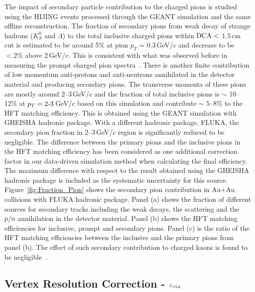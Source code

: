 \documentclass[%
 reprint,	
 amsmath,amssymb,
 aps,
 prc,
]{revtex4-1}
\begin{document}
The impact of secondary particle contribution to the charged pions is studied using the HIJING events processed through the GEANT simulation and the same offline reconstruction. The fraction of secondary pions from weak decay of strange hadrons ($K^0_S$ and $\Lambda$) to the total inclusive charged pions within ${\rm DCA}<$ 1.5\,cm cut is estimated to be around 5\% at pion $p_{T}$ = 0.3\,GeV/$c$ and decrease to be $<2\%$ above 2\,GeV/$c$. This is consistent with what was observed before in measuring the prompt charged pion spectra~\cite{Adams:2003xp}. There is another finite contribution of low momentum anti-protons and anti-neutrons annihilated in the detector material and producing secondary pions. The transverse momenta of these pions are mostly around 2--3\,GeV/$c$ and the fraction of total inclusive pions is $\sim$ 10--12\% at $p_{T} =2\textup{-}3$\,GeV/$c$ based on this simulation and contribute $\sim$ 5--8\% to the HFT matching efficiency. This is obtained using the GEANT simulation with GHEISHA hadronic package. With a different hadronic package, FLUKA, the secondary pion fraction in 2--3\,GeV/$c$ region is significantly reduced to be negligible. The difference between the primary pions and the inclusive pions in the HFT matching efficiency has been considered as one additional correction factor in our data-driven simulation method when calculating the final efficiency. The maximum difference with respect to the result obtained using the GHEISHA hadronic package is included as the systematic uncertainty for this source. Figure~\ref{fig:Fraction_Pion} shows the secondary pion contribution in Au+Au collisions with FLUKA hadronic package. Panel (a) shows the fraction of different sources for secondary tracks including the weak decays, the scattering and the $\bar{p}/\bar{n}$ annihilation in the detector material. Panel (b) shows the HFT matching efficiencies for inclusive, prompt and secondary pions. Panel (c) is the ratio of the HFT matching efficiencies between the inclusive and the primary pions from panel (b). The effect of such secondary contribution to charged kaons is found to be negligible~\cite{Adams:2003xp}.

\subsection{Vertex Resolution Correction - $\varepsilon_{\rm vtx}$}
\label{correction:vtx}
\end{document}
